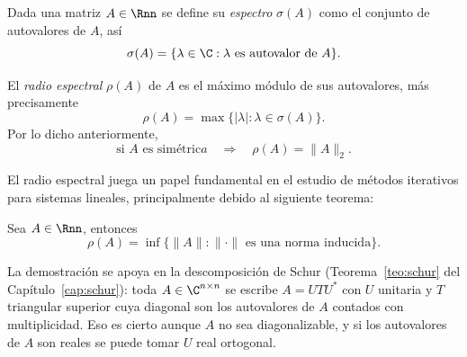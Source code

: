 Dada una matriz $A\in\Rnn$ se define su \emph{espectro} $\sigma(A)$ como el conjunto de autovalores de $A$, así
\[
\sigma(A) = \{ \lambda \in \C : \lambda \text{ es autovalor de }A\}.
\]

El \emph{radio espectral} $\rho(A)$ de $A$ es el máximo módulo de sus autovalores, más precisamente
\[
\rho(A) = \max \{ |\lambda| : \lambda \in \sigma(A) \}.
\]
Por lo dicho anteriormente,
\[
\text{si $A$ es simétric}a \quad\Longrightarrow\quad \rho(A) = \|A\|_2.
\]

El radio espectral juega un papel fundamental en el estudio de métodos iterativos para sistemas lineales, principalmente debido al siguiente teorema:

\begin{thm}
  \label{T:radio-espectral}
  Sea $A\in\Rnn$, entonces
  \[
  \rho(A) = \inf \{ \|A\| : \|\cdot\| \text{ es una norma inducida} \}.
  \]
\end{thm}


La demostración se apoya en la descomposición de Schur
(Teorema~\ref{teo:schur} del Capítulo~\ref{cap:schur}): toda
$A\in\C^{n\times n}$ se escribe $A=UTU^{*}$ con $U$ unitaria y $T$ triangular
superior cuya diagonal son los autovalores de $A$ contados con multiplicidad.
Eso es cierto aunque $A$ no sea diagonalizable, y si los autovalores de $A$ son
reales se puede tomar $U$ real ortogonal.

